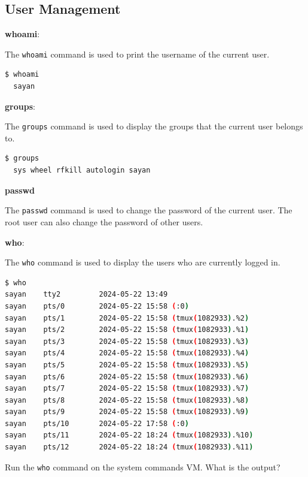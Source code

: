 \subsection{User Management}

\textbf{whoami}:

The \texttt{whoami} command is used to print the username of the current user.

\begin{lstlisting}[language=bash]
  $ whoami
  sayan
\end{lstlisting}

\textbf{groups}:

The \texttt{groups} command is used to display the groups that the current user belongs to.

\begin{lstlisting}[language=bash]
  $ groups
  sys wheel rfkill autologin sayan
\end{lstlisting}

\textbf{passwd}

The \texttt{passwd} command is used to change the password of the current user.
The root user can also change the password of other users.

\textbf{who}:

The \texttt{who} command is used to display the users who are currently logged in.

\begin{lstlisting}[language=bash]
$ who
sayan    tty2         2024-05-22 13:49
sayan    pts/0        2024-05-22 15:58 (:0)
sayan    pts/1        2024-05-22 15:58 (tmux(1082933).%2)
sayan    pts/2        2024-05-22 15:58 (tmux(1082933).%1)
sayan    pts/3        2024-05-22 15:58 (tmux(1082933).%3)
sayan    pts/4        2024-05-22 15:58 (tmux(1082933).%4)
sayan    pts/5        2024-05-22 15:58 (tmux(1082933).%5)
sayan    pts/6        2024-05-22 15:58 (tmux(1082933).%6)
sayan    pts/7        2024-05-22 15:58 (tmux(1082933).%7)
sayan    pts/8        2024-05-22 15:58 (tmux(1082933).%8)
sayan    pts/9        2024-05-22 15:58 (tmux(1082933).%9)
sayan    pts/10       2024-05-22 17:58 (:0)
sayan    pts/11       2024-05-22 18:24 (tmux(1082933).%10)
sayan    pts/12       2024-05-22 18:24 (tmux(1082933).%11)
\end{lstlisting}

\begin{exercise}
  Run the \texttt{who} command on the system commands VM.
  What is the output?
\end{exercise}

